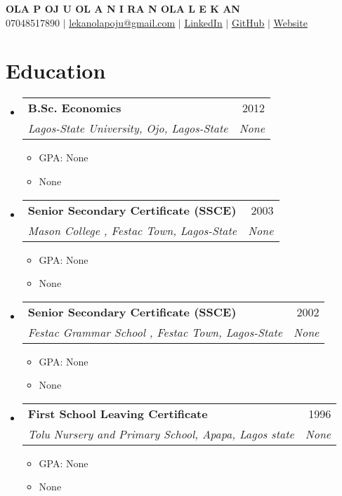 \documentclass[letterpaper,11pt]{article}
\makeatletter
\newcommand{\resumeItem}[1]{
  \item\small{
    {#1 \vspace{-2pt}}
  }
}
\newcommand{\resumeSubheading}[4]{
  \vspace{-2pt}\item
    \begin{tabular*}{0.97\textwidth}[t]{l@{\extracolsep{\fill}}r}
      \textbf{#1} & #2 \\
      \textit{\small#3} & \textit{\small #4} \\
    \end{tabular*}\vspace{-7pt}
}
\newcommand{\resumeSubHeadingListStart}{\begin{itemize}[leftmargin=0.15in, label={}]}
\newcommand{\resumeSubHeadingListEnd}{\end{itemize}}
\newcommand{\resumeItemListStart}{\begin{itemize}}
\newcommand{\resumeItemListEnd}{\end{itemize}\vspace{-5pt}}
\makeatother
\begin{document}
\begin{center}
    \textbf{\Huge \scshape OLA P OJ U  OL A N I RA N OLA L E K AN} \\ \vspace{1pt}
    \small 07048517890 $|$ \href{mailto:lekanolapoju@gmail.com}{\underline{lekanolapoju@gmail.com}} $|$ \href{https://None}{\underline{LinkedIn}} $|$ \href{https://None}{\underline{GitHub}} $|$ \href{https://None}{\underline{Website}}
\end{center}

\section{Education}
  \resumeSubHeadingListStart
    \resumeSubheading
      {B.Sc. Economics}{2012}
      {Lagos-State University, Ojo, Lagos-State}{None}
      \resumeItemListStart
        \resumeItem{GPA: None}
        \resumeItem{None}
      \resumeItemListEnd
    \resumeSubheading
      {Senior Secondary Certificate (SSCE)}{2003}
      {Mason College , Festac Town, Lagos-State}{None}
      \resumeItemListStart
        \resumeItem{GPA: None}
        \resumeItem{None}
      \resumeItemListEnd
    \resumeSubheading
      {Senior Secondary Certificate (SSCE)}{2002}
      {Festac Grammar School , Festac Town, Lagos-State}{None}
      \resumeItemListStart
        \resumeItem{GPA: None}
        \resumeItem{None}
      \resumeItemListEnd
    \resumeSubheading
      {First School Leaving Certificate}{1996}
      {Tolu Nursery and Primary School, Apapa, Lagos state}{None}
      \resumeItemListStart
        \resumeItem{GPA: None}
        \resumeItem{None}
      \resumeItemListEnd
  \resumeSubHeadingListEnd

\end{document}
